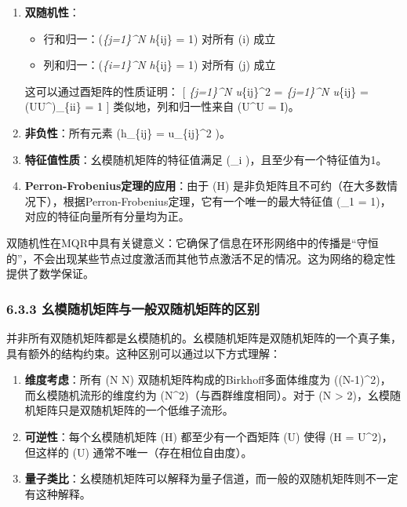 \documentclass[
  12pt,
]{article}
\providecommand{\tightlist}{%
  \setlength{\itemsep}{0pt}\setlength{\parskip}{0pt}}
\begin{document}
\begin{enumerate}
\def\labelenumi{\arabic{enumi}.}
\item
  \textbf{双随机性}：

  \begin{itemize}
  \tightlist
  \item
    行和归一：(\sum\emph{\{j=1\}\^{}N h}\{ij\} = 1) 对所有 (i) 成立
  \item
    列和归一：(\sum\emph{\{i=1\}\^{}N h}\{ij\} = 1) 对所有 (j) 成立
  \end{itemize}

  这可以通过酉矩阵的性质证明： {[} \sum\emph{\{j=1\}\^{}N
  \textbar u}\{ij\}\textbar\^{}2 = \sum\emph{\{j=1\}\^{}N u}\{ij\}
   = (UU\^{}\dagger)\_\{ii\} = 1 {]}
  类似地，列和归一性来自 (U\^{}\dagger U = I)。
\item
  \textbf{非负性}：所有元素 (h\_\{ij\} = \textbar u\_\{ij\}\textbar\^{}2
  )。
\item
  \textbf{特征值性质}：幺模随机矩阵的特征值满足
  (\textbar{}\lambda\_i\textbar{} )，且至少有一个特征值为1。
\item
  \textbf{Perron-Frobenius定理的应用}：由于 (H)
  是非负矩阵且不可约（在大多数情况下），根据Perron-Frobenius定理，它有一个唯一的最大特征值
  (\lambda\_1 = 1)，对应的特征向量所有分量均为正。
\end{enumerate}

双随机性在MQR中具有关键意义：它确保了信息在环形网络中的传播是``守恒的''，不会出现某些节点过度激活而其他节点激活不足的情况。这为网络的稳定性提供了数学保证。

\hypertarget{ux5e7aux6a21ux968fux673aux77e9ux9635ux4e0eux4e00ux822cux53ccux968fux673aux77e9ux9635ux7684ux533aux522b}{%
\subsubsection{6.3.3
幺模随机矩阵与一般双随机矩阵的区别}\label{ux5e7aux6a21ux968fux673aux77e9ux9635ux4e0eux4e00ux822cux53ccux968fux673aux77e9ux9635ux7684ux533aux522b}}

并非所有双随机矩阵都是幺模随机的。幺模随机矩阵是双随机矩阵的一个真子集，具有额外的结构约束。这种区别可以通过以下方式理解：

\begin{enumerate}
\def\labelenumi{\arabic{enumi}.}
\item
  \textbf{维度考虑}：所有 (N \times N)
  双随机矩阵构成的Birkhoff多面体维度为
  ((N-1)\^{}2)，而幺模随机流形的维度约为
  (N\^{}2)（与酉群维度相同）。对于 (N \textgreater{}
  2)，幺模随机矩阵只是双随机矩阵的一个低维子流形。
\item
  \textbf{可逆性}：每个幺模随机矩阵 (H) 都至少有一个酉矩阵 (U) 使得 (H =
  \textbar U\textbar\^{}2)，但这样的 (U) 通常不唯一（存在相位自由度）。
\item
  \textbf{量子类比}：幺模随机矩阵可以解释为量子信道，而一般的双随机矩阵则不一定有这种解释。
\end{enumerate}
\end{document}
